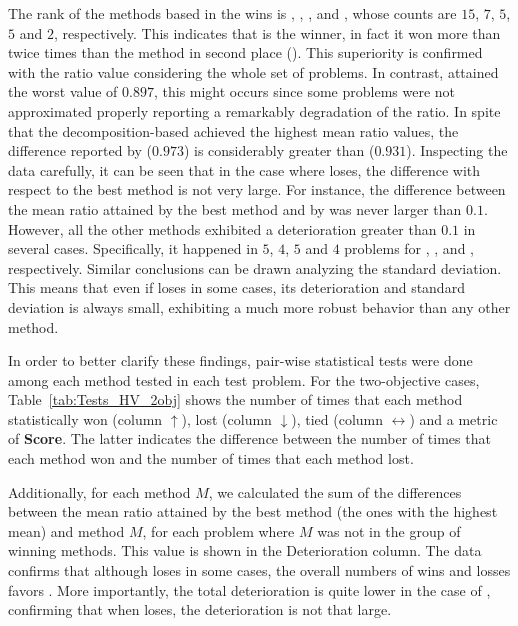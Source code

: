 The rank of the methods based in the wins is \VSDMOEAD{}, \RMOEA{}, \NSGAIII{}, \MOEADDE{} and \NSGAII{}, whose counts are $15$, $7$, $5$, $5$ and $2$, respectively.
%
This indicates that \VSDMOEAD{} is the winner, in fact it won more than twice times than the method in second place (\RMOEA{}).
%
This superiority is confirmed with the \HV{} ratio value considering the whole set of problems.
%
In contrast, \RMOEA{} attained the worst value of $0.897$, this might occurs since some problems were not approximated properly reporting a remarkably degradation of the \HV{} ratio.
%
In spite that the decomposition-based \MOEAS{} achieved the highest mean \HV{} ratio values, the difference reported by \VSDMOEAD{} ($0.973$) is considerably greater than \MOEADDE{} ($0.931$).
%
Inspecting the data carefully, it can be seen that in the case where \VSDMOEAD{} loses, the difference with respect to the best method is not very large.
%
For instance, the difference between the mean \HV{} ratio attained by the best method and by \VSDMOEAD{} was never larger than $0.1$.
%
However, all the other methods exhibited a deterioration greater than $0.1$ in several cases.
%
Specifically, it happened in $5$, $4$, $5$ and $4$ problems for \RMOEA{}, \NSGAII{}, \NSGAIII{} and \MOEADDE{}, respectively.
%
Similar conclusions can be drawn analyzing the standard deviation.
%
This means that even if \VSDMOEAD{} loses in some cases, its deterioration and standard deviation is always small, exhibiting a much more robust behavior than any other method.


In order to better clarify these findings, pair-wise statistical tests were done among each method tested in each test problem.
%
For the two-objective cases, Table~\ref{tab:Tests_HV_2obj} shows the number of times that each method statistically won (column $\uparrow$), lost (column $\downarrow$), tied (column $\leftrightarrow$) and a metric of \textbf{Score}.
%
The latter indicates the difference between the number of times that each method won and the number of times that each method lost.

%
Additionally, for each method $M$, we calculated the sum of the differences between the mean \HV{} ratio attained by the best method (the ones with the highest mean) and method $M$, for each problem where $M$ was not in the group of winning methods.
%
This value is shown in the Deterioration column.
%
The data confirms that although \VSDMOEAD{} loses in some cases, the overall numbers of wins and losses favors \VSDMOEAD{}.
%
More importantly, the total deterioration is quite lower in the case of \VSDMOEAD{}, confirming that when \VSDMOEAD{} loses, the deterioration is not that large.


